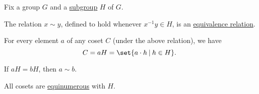 \begin{proposition}\label{thm:subgroup_cosets}
  Fix a group \( G \) and a \hyperref[def:group/submodel]{subgroup} \( H \) of \( G \).

  \begin{thmenum}
     The relation \( x \sim y \), defined to hold whenever \( x^{-1} y \in H \), is an \hyperref[def:equivalence_relation]{equivalence relation}.

     For every element \( a \) of any coset \( C \) (under the above relation), we have
    \begin{equation*}
      C = a H = \set{ a \cdot h \given h \in H }.
    \end{equation*}

     If \( a H = b H \), then \( a \sim b \).

     All cosets are \hyperref[def:equinumerosity]{equinumerous} with \( H \).
  \end{thmenum}
\end{proposition}
